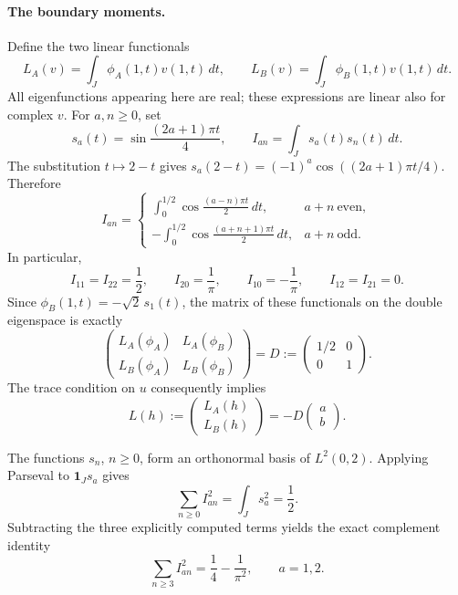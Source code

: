 \documentclass[11pt,reqno]{amsart}
\numberwithin{equation}{section}
\begin{document}
\paragraph{The boundary moments.}
Define the two linear functionals
\[
 L_A(v)=\int_J\phi_A(1,t)v(1,t)\,dt,\qquad
 L_B(v)=\int_J\phi_B(1,t)v(1,t)\,dt.
\]
All eigenfunctions appearing here are real; these expressions are linear
also for complex $v$. For $a,n\ge0$, set
\[
 s_a(t)=\sin\frac{(2a+1)\pi t}{4},\qquad
 I_{an}=\int_J s_a(t)s_n(t)\,dt.
\]
The substitution $t\mapsto2-t$ gives
$s_a(2-t)=(-1)^a\cos((2a+1)\pi t/4)$. Therefore
\begin{equation}
 I_{an}=
 \begin{cases}
 \displaystyle\int_0^{1/2}\cos\frac{(a-n)\pi t}{2}\,dt,
       &a+n\ \text{even},\\[6pt]
 \displaystyle-\int_0^{1/2}\cos\frac{(a+n+1)\pi t}{2}\,dt,
       &a+n\ \text{odd}.
 \end{cases}
 \label{bd:moment-integrals}
\end{equation}
In particular,
\[
 I_{11}=I_{22}=\frac12,\qquad
 I_{20}=\frac1\pi,\qquad I_{10}=-\frac1\pi,\qquad
 I_{12}=I_{21}=0.
\]
Since $\phi_B(1,t)=-\sqrt2\,s_1(t)$, the matrix of these functionals
on the double eigenspace is exactly
\begin{equation}
 \begin{pmatrix}
  L_A(\phi_A)&L_A(\phi_B)\\
  L_B(\phi_A)&L_B(\phi_B)
 \end{pmatrix}
 =D:=\begin{pmatrix}1/2&0\\0&1\end{pmatrix}.
 \label{bd:trace-matrix}
\end{equation}
The trace condition on $u$ consequently implies
\begin{equation}
 L(h):=\begin{pmatrix}L_A(h)\\L_B(h)\end{pmatrix}
 =-D\begin{pmatrix}a\\b\end{pmatrix}.
 \label{bd:moment-constraint}
\end{equation}

The functions $s_n$, $n\ge0$, form an orthonormal basis of $L^2(0,2)$.
Applying Parseval to $\mathbf1_Js_a$ gives
\[
 \sum_{n\ge0}I_{an}^2=\int_J s_a^2=\frac12.
\]
Subtracting the three explicitly computed terms yields the exact
complement identity
\begin{equation}
 \sum_{n\ge3}I_{an}^2=\frac14-\frac1{\pi^2},
 \qquad a=1,2.
 \label{bd:parseval}
\end{equation}
\end{document}
